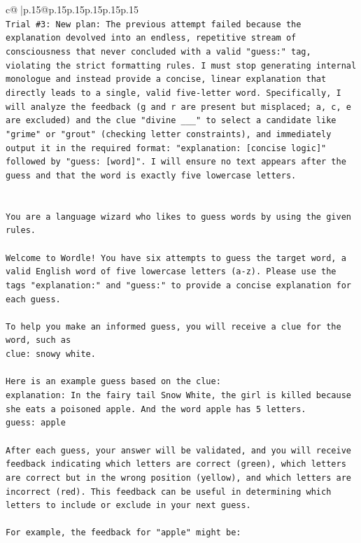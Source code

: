 \documentclass{article}
\begin{document}
{\begin{supertabular}{c@{$\;$}|p{.15\linewidth}@{}p{.15\linewidth}p{.15\linewidth}p{.15\linewidth}p{.15\linewidth}p{.15\linewidth}}
{{{\\ 
\texttt{Trial \#3: New plan: The previous attempt failed because the explanation devolved into an endless, repetitive stream of consciousness that never concluded with a valid "guess:" tag, violating the strict formatting rules. I must stop generating internal monologue and instead provide a concise, linear explanation that directly leads to a single, valid five{-}letter word. Specifically, I will analyze the feedback (g and r are present but misplaced; a, c, e are excluded) and the clue "divine \_\_\_" to select a candidate like "grime" or "grout" (checking letter constraints), and immediately output it in the required format: "explanation: {[}concise logic{]}" followed by "guess: {[}word{]}". I will ensure no text appears after the guess and that the word is exactly five lowercase letters.} \\
\\ 
\\ 
\texttt{You are a language wizard who likes to guess words by using the given rules.} \\
\\ 
\texttt{Welcome to Wordle! You have six attempts to guess the target word, a valid English word of five lowercase letters (a{-}z). Please use the tags "explanation:" and "guess:" to provide a concise explanation for each guess.} \\
\\ 
\texttt{To help you make an informed guess, you will receive a clue for the word, such as} \\
\texttt{clue: snowy white.} \\
\\ 
\texttt{Here is an example guess based on the clue:} \\
\texttt{explanation: In the fairy tail Snow White, the girl is killed because she eats a poisoned apple. And the word apple has 5 letters.} \\
\texttt{guess: apple} \\
\\ 
\texttt{After each guess, your answer will be validated, and you will receive feedback indicating which letters are correct (green), which letters are correct but in the wrong position (yellow), and which letters are incorrect (red). This feedback can be useful in determining which letters to include or exclude in your next guess.} \\
\\ 
\texttt{For example, the feedback for "apple" might be:} \\
}}}
\end{supertabular}}
\end{document}

